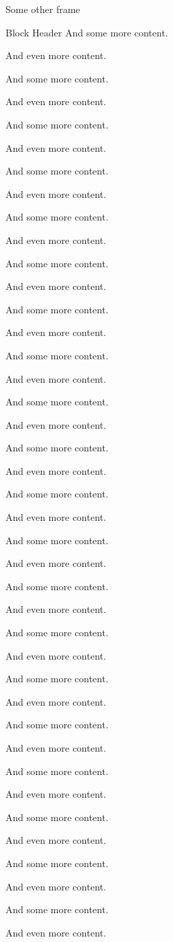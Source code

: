 \documentclass[t]{beamer}
\begin{document}
\begin{refsection}
\begin{frame}{Some other frame}
\begin{block}{Block Header}
And some more content.

And even more content.

And some more content.

And even more content.

And some more content.

And even more content.

And some more content.

And even more content.

And some more content.

And even more content.

And some more content.

And even more content.

And some more content.

And even more content.

And some more content.

And even more content.

And some more content.

And even more content.

And some more content.

And even more content.

And some more content.

And even more content.

And some more content.

And even more content.

And some more content.

And even more content.

And some more content.

And even more content.

And some more content.

And even more content.

And some more content.

And even more content.

And some more content.

And even more content.

And some more content.

And even more content.

And some more content.

And even more content.


And some more content.

And even more content.
\end{block}
\end{frame}

\end{refsection}

\begin{frame}
\bibliographie
\end{frame}
\end{document}
